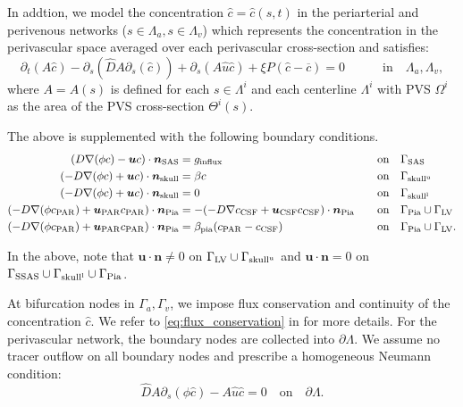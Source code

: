 In addtion, we model the concentration $\hat{c} = \hat{c}(s, t)$ in
the periarterial and perivenous networks ($s \in \Lambda_a, s \in
\Lambda_v$) which represents the concentration in the perivascular
space averaged over each perivascular cross-section and satisfies:
\begin{equation}
\partial_t (A  \hat c) - \partial_s(\hat D A \partial_s ( \hat c)) +\partial_s(A \hat u \hat c )  +  \xi P (\hat c - \overline{c}) = 0  \qquad \quad \mathrm{in} \quad  \Lambda_a, \Lambda_v ,
\end{equation}
where $A = A(s)$ is defined for each $s \in \Lambda^i$ and each
centerline $\Lambda^i$ with PVS $\Omega^i$ as the area of the PVS
cross-section $\Theta^i(s)$.



The above is supplemented with the following boundary conditions. 
\begin{alignat}{2}
(D \nabla (\phi c) - \bm u c ) \cdot \bm{n}_{\rm SAS} &= g_{\mathrm{influx}} &&  \quad  \mathrm{on} \quad \Gamma_{\rm SAS}  \\ 
(-D \nabla (\phi c) + \bm u c ) \cdot \bm{n}_{\rm skull} & =   \beta c  &&  \quad  \mathrm{on} \quad \Gamma_{\rm skull^{u}}  \\ 
(-D \nabla (\phi c) + \bm u c ) \cdot \bm{n}_{\rm skull} & =   0  &&  \quad  \mathrm{on} \quad \Gamma_{\rm skull^{l}}  \\ 
(-D \nabla (\phi c_{\rm{PAR}}) + \bm u_{\rm{PAR}} c_{\rm{PAR} }) \cdot \bm{n}_{\rm{Pia}} &= - (-D \nabla  c_{\rm{CSF}} + \bm u_{\rm CSF} c_{\rm CSF} ) \cdot \bm{n}_{\rm{Pia}} &&  \quad  \mathrm{on} \quad \Gamma_{\rm{Pia}} \cup \Gamma_{\mathrm{LV}}  \\ 
(-D \nabla (\phi c_{\rm{PAR}}) + \bm u_{\rm{PAR}} c_{\rm{PAR} }) \cdot \bm{n}_{\rm{Pia}} & = \beta_{\rm{pia}} (c_{\rm PAR} - c_{\mathrm{CSF}}) &&  \quad  \mathrm{on} \quad \Gamma_{\rm{Pia}} \cup \Gamma_{\mathrm{LV}}   .  
\end{alignat} 



In the above, note that $\bm u \cdot \bm n  \neq 0$ on $\Gamma_{\rm LV} \cup \Gamma_{\rm skull^u}$ and $\bm u \cdot \bm n = 0$ on $\Gamma_{\rm SSAS} \cup \Gamma_{\rm skull^l} \cup \Gamma_{\rm Pia}$. 

At bifurcation nodes in $\Gamma_a, \Gamma_v$, we impose flux conservation and continuity of the concentration $\hat c$. We refer to \eqref{eq:flux_conservation} in  for more details. For the perivascular network, the boundary nodes are collected into $\partial \Lambda$. We assume no tracer outflow on all boundary nodes and prescribe a homogeneous Neumann condition: 
\begin{equation}
    \hat D A \partial_s (\phi \hat c) - A \hat u \hat c  = 0 \quad \mathrm{on} \quad \partial \Lambda. 
\end{equation}


